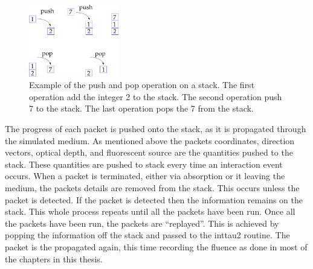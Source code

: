 \begin{appendices}
\begin{figure}[!htpb]
	\centering
	\includegraphics[width=0.35\textwidth]{stack.pdf}
	\caption{Example of the push and pop operation on a stack. The first operation add the integer 2 to the stack. The second operation push 7 to the stack. The last operation pops the 7 from the stack.}
	\label{fig:stack}
\end{figure}

The progress of each packet is pushed onto the stack, as it is propagated through the simulated medium. 
As mentioned above the packets coordinates, direction vectors, optical depth, and fluorescent source are the quantities pushed to the stack.
These quantities are pushed to stack every time an interaction event occurs.
When a packet is terminated, either via absorption or it leaving the medium, the packets details are removed from the stack.
This occurs unless the packet is detected.
If the packet is detected then the information remains on the stack.
This whole process repeats until all the packets have been run.
Once all the packets have been run, the packets are ``replayed''.
This is achieved by popping the information off the stack and passed to the inttau2 routine.
The packet is the propagated again, this time recording the fluence as done in most of the chapters in this thesis.

\end{appendices}
